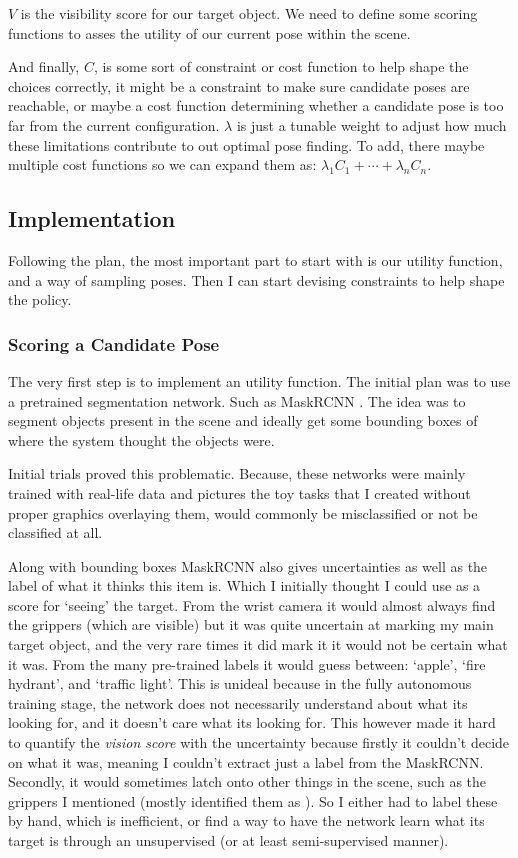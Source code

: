 $V$ is the visibility score for our target object. We need to define some scoring functions to asses the utility of our current pose within the scene.

And finally, $C$, is some sort of constraint or cost function to help shape the choices correctly, it might be a constraint to make sure candidate poses are reachable, or maybe a cost function determining whether a candidate pose is too far from the current configuration. $\lambda$ is just a tunable weight to adjust how much these limitations contribute to out optimal pose finding. To add, there maybe multiple cost functions so we can expand them as: \(\lambda_1 C_1 + \cdots +\lambda_n C_n \).


\subsection{Implementation}
Following the plan, the most important part to start with is our utility function, and a way of sampling poses. Then I can start devising constraints to help shape the policy.

\subsubsection{Scoring a Candidate Pose}
The very first step is to implement an utility function. The initial plan was to use a pretrained segmentation network. Such as MaskRCNN . The idea was to segment objects present in the scene and ideally get some bounding boxes of where the system thought the objects were. 

Initial trials proved this problematic. Because, these networks were mainly trained with real-life data and pictures the toy tasks that I created without proper graphics overlaying them, would commonly be misclassified or not be classified at all. 

Along with bounding boxes MaskRCNN also gives uncertainties as well as the label of what it thinks this item is. Which I initially thought I could use as a score for `seeing' the target. From the wrist camera it would almost always find the grippers (which are visible) but it was quite uncertain at marking my main target object, and the very rare times it did mark it it would not be certain what it was. From the many pre-trained labels it would guess between: `apple', `fire hydrant', and `traffic light'. This is unideal because in the fully autonomous training stage, the network does not necessarily understand about what its looking for, and it doesn't care what its looking for. This however made it hard to quantify the \emph{vision score} with the uncertainty because firstly it couldn't decide on what it was, meaning I couldn't extract just a label from the MaskRCNN. Secondly,  it would sometimes latch onto other things in the scene, such as the grippers I mentioned (mostly identified them as ). So I either had to label these by hand, which is inefficient, or find a way to have the network learn what its target is through an unsupervised (or at least semi-supervised manner). 


